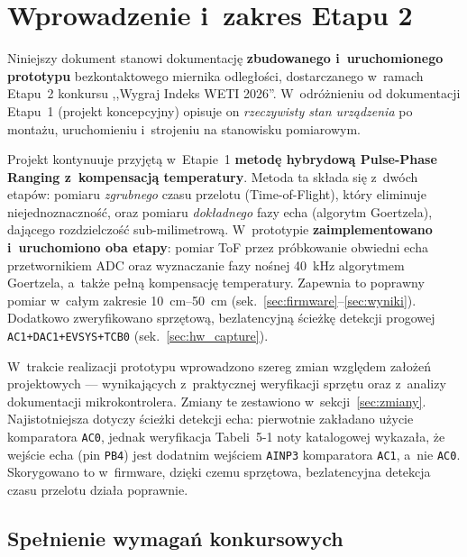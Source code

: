 \documentclass[a4paper,11pt]{article}
\begin{document}
\tableofcontents
\newpage

\section{Wprowadzenie i~zakres Etapu 2}
\label{sec:wstep}

Niniejszy dokument stanowi dokumentację \textbf{zbudowanego i~uruchomionego
prototypu} bezkontaktowego miernika odległości, dostarczanego w~ramach Etapu~2
konkursu ,,Wygraj Indeks WETI 2026''. W~odróżnieniu od dokumentacji Etapu~1
(projekt koncepcyjny) opisuje on \emph{rzeczywisty stan urządzenia} po montażu,
uruchomieniu i~strojeniu na stanowisku pomiarowym.

Projekt kontynuuje przyjętą w~Etapie~1 \textbf{metodę hybrydową Pulse-Phase
Ranging z~kompensacją temperatury}. Metoda ta składa się z~dwóch etapów: pomiaru
\emph{zgrubnego} czasu przelotu (Time-of-Flight), który eliminuje
niejednoznaczność, oraz pomiaru \emph{dokładnego} fazy echa (algorytm
Goertzela), dającego rozdzielczość sub-milimetrową. W~prototypie
\textbf{zaimplementowano i~uruchomiono oba etapy}: pomiar ToF przez
próbkowanie obwiedni echa przetwornikiem ADC oraz wyznaczanie fazy nośnej
\SI{40}{\kilo\hertz} algorytmem Goertzela, a~także pełną kompensację
temperatury. Zapewnia to poprawny pomiar w~całym zakresie
\SIrange{10}{50}{\centi\metre} (sek.~\ref{sec:firmware}--\ref{sec:wyniki}).
Dodatkowo zweryfikowano sprzętową, bezlatencyjną ścieżkę detekcji progowej
\texttt{AC1+DAC1+EVSYS+TCB0} (sek.~\ref{sec:hw_capture}).

W~trakcie realizacji prototypu wprowadzono szereg zmian względem założeń
projektowych --- wynikających z~praktycznej weryfikacji sprzętu oraz z~analizy
dokumentacji mikrokontrolera. Zmiany te zestawiono w~sekcji~\ref{sec:zmiany}.
Najistotniejsza dotyczy ścieżki detekcji echa: pierwotnie zakładano użycie
komparatora \texttt{AC0}, jednak weryfikacja Tabeli~5-1 noty katalogowej
wykazała, że wejście echa (pin \texttt{PB4}) jest dodatnim wejściem
\texttt{AINP3} komparatora \texttt{AC1}, a~nie \texttt{AC0}. Skorygowano to
w~firmware, dzięki czemu sprzętowa, bezlatencyjna detekcja czasu przelotu
działa poprawnie.

\subsection{Spełnienie wymagań konkursowych}
\end{document}
